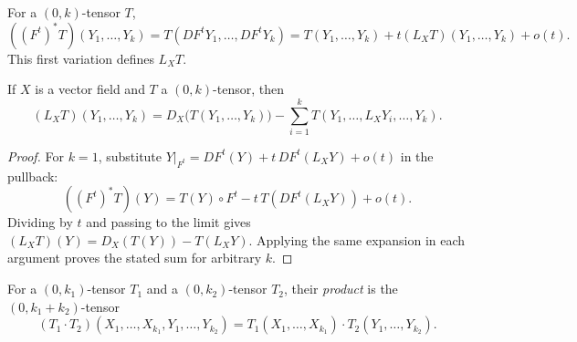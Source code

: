 \begin{definition}
  \label{def:pet-ch2-lie-derivative-tensor}


  For a $(0,k)$-tensor $T$,
  \[
    ((F^t)^*T)(Y_1,\dots,Y_k)
      =T(DF^tY_1,\dots,DF^tY_k)
      =T(Y_1,\dots,Y_k)+t(L_XT)(Y_1,\dots,Y_k)+o(t).
  \]
  This first variation defines $L_XT$.
\end{definition}

\begin{proposition}
  \label{prop:pet-ch2-lie-derivative-tensor-formula}


  If $X$ is a vector field and $T$ a $(0,k)$-tensor, then
  \[
    (L_XT)(Y_1,\dots,Y_k)
    = D_X\big(T(Y_1,\dots,Y_k)\big)-\sum_{i=1}^kT(Y_1,\dots,L_XY_i,\dots,Y_k).
  \]
\end{proposition}
\begin{proof}

  \sketch
  For $k=1$, substitute
  $Y|_{F^t}=DF^t(Y)+t\,DF^t(L_XY)+o(t)$ in the pullback:
  \[
    ((F^t)^*T)(Y)
      =T(Y)\circ F^t-t\,T(DF^t(L_XY))+o(t).
  \]
  Dividing by $t$ and passing to the limit gives
  $(L_XT)(Y)=D_X(T(Y))-T(L_XY)$. Applying the same expansion in each
  argument proves the stated sum for arbitrary $k$.
\end{proof}


\begin{definition}
  \label{def:pet-ch2-tensor-product}


  For a $(0,k_1)$-tensor $T_1$ and a $(0,k_2)$-tensor $T_2$, their
  \emph{product} is the $(0,k_1+k_2)$-tensor
  \[
    (T_1\cdot T_2)(X_1,\dots,X_{k_1},Y_1,\dots,Y_{k_2})
    =T_1(X_1,\dots,X_{k_1})\cdot T_2(Y_1,\dots,Y_{k_2}).
  \]
\end{definition}

